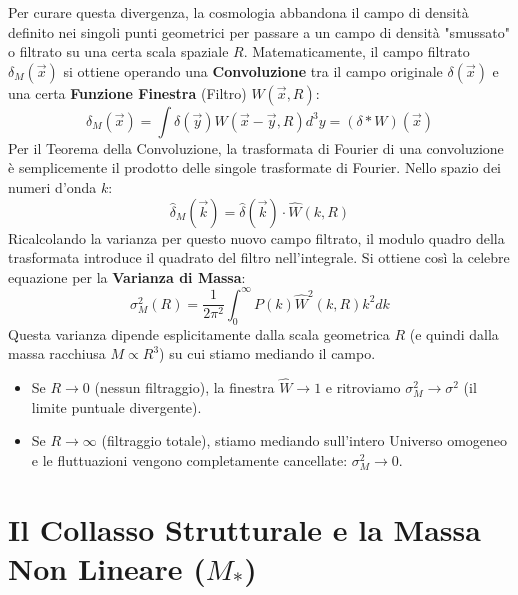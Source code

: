 \documentclass[11pt,a4paper]{report}
\begin{document}
Per curare questa divergenza, la cosmologia abbandona il campo di densità definito nei singoli punti geometrici per passare a un campo di densità "smussato" o filtrato su una certa scala spaziale $R$.
Matematicamente, il campo filtrato $\delta_M(\vec{x})$ si ottiene operando una \textbf{Convoluzione} tra il campo originale $\delta(\vec{x})$ e una certa \textbf{Funzione Finestra} (Filtro) $W(\vec{x}, R)$:
\begin{equation}
\delta_M(\vec{x}) = \int \delta(\vec{y}) W(\vec{x} - \vec{y}, R) d^3y = (\delta * W)(\vec{x})
\end{equation}
Per il Teorema della Convoluzione, la trasformata di Fourier di una convoluzione è semplicemente il prodotto delle singole trasformate di Fourier. Nello spazio dei numeri d'onda $k$:
\begin{equation}
\hat{\delta}_M(\vec{k}) = \hat{\delta}(\vec{k}) \cdot \hat{W}(k, R)
\end{equation}
Ricalcolando la varianza per questo nuovo campo filtrato, il modulo quadro della trasformata introduce il quadrato del filtro nell'integrale. Si ottiene così la celebre equazione per la \textbf{Varianza di Massa}:
\begin{equation}
\sigma_M^2(R) = \frac{1}{2\pi^2} \int_0^\infty P(k) \hat{W}^2(k, R) k^2 dk
\end{equation}
Questa varianza dipende esplicitamente dalla scala geometrica $R$ (e quindi dalla massa racchiusa $M \propto R^3$) su cui stiamo mediando il campo.
\begin{itemize}
    \item Se $R \to 0$ (nessun filtraggio), la finestra $\hat{W} \to 1$ e ritroviamo $\sigma_M^2 \to \sigma^2$ (il limite puntuale divergente).
    \item Se $R \to \infty$ (filtraggio totale), stiamo mediando sull'intero Universo omogeneo e le fluttuazioni vengono completamente cancellate: $\sigma_M^2 \to 0$.
\end{itemize}

\section{Il Collasso Strutturale e la Massa Non Lineare ($M_*$)}
\end{document}
